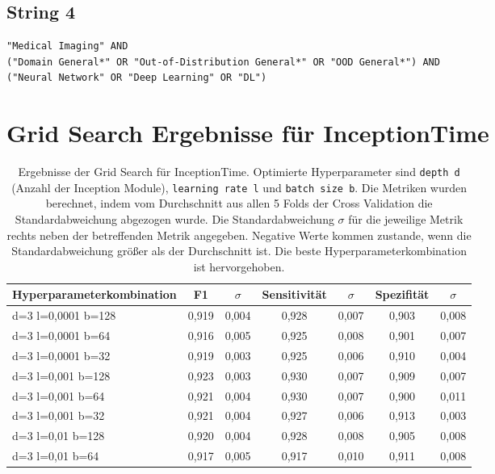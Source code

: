 \subsection*{String 4}
\begin{verbatim}
"Medical Imaging" AND 
("Domain General*" OR "Out-of-Distribution General*" OR "OOD General*") AND
("Neural Network" OR "Deep Learning" OR "DL")
\end{verbatim} 

\newpage
\section{Grid Search Ergebnisse für InceptionTime}

\begin{table}[h!]
\centering
\caption[Ergebnisse der InceptionTime Grid Search]{Ergebnisse der Grid Search für InceptionTime. Optimierte Hyperparameter sind \texttt{depth d} (Anzahl der Inception Module), \texttt{learning rate l} und \texttt{batch size b}. Die Metriken wurden berechnet, indem vom Durchschnitt aus allen 5 Folds der Cross Validation die Standardabweichung abgezogen wurde. Die Standardabweichung $\sigma$ für die jeweilige Metrik rechts neben der betreffenden Metrik angegeben. Negative Werte kommen zustande, wenn die Standardabweichung größer als der Durchschnitt ist. Die beste Hyperparameterkombination ist hervorgehoben.}
\label{tab:GridSearch_InceptionTime}
\begin{tabular}{lcccccc}
\toprule
\textbf{Hyperparameterkombination} & \textbf{F1} & \textbf{$\sigma$} & \textbf{Sensitivität} & \textbf{$\sigma$} & \textbf{Spezifität} & \textbf{$\sigma$}\\
\midrule 
d=3 l=0,0001 b=128  & 0,919  & 0,004  & 0,928  & 0,007 & 0,903 & 0,008 \\
d=3 l=0,0001 b=64  & 0,916  & 0,005  & 0,925  & 0,008 & 0,901 & 0,007 \\
d=3 l=0,0001 b=32  & 0,919  & 0,003  & 0,925  & 0,006 & 0,910 & 0,004 \\
d=3 l=0,001	b=128  & 0,923  & 0,003  & 0,930  & 0,007 & 0,909 & 0,007 \\
d=3 l=0,001	b=64  & 0,921  & 0,004  & 0,930  & 0,007 & 0,900 & 0,011 \\
d=3 l=0,001	b=32  & 0,921  & 0,004  & 0,927  & 0,006 & 0,913 & 0,003 \\
d=3 l=0,01 b=128  & 0,920  & 0,004  & 0,928  & 0,008 & 0,905 & 0,008 \\
d=3 l=0,01 b=64  & 0,917  & 0,005  & 0,917  & 0,010 & 0,911 & 0,008 \\

\end{tabular}
\end{table}
